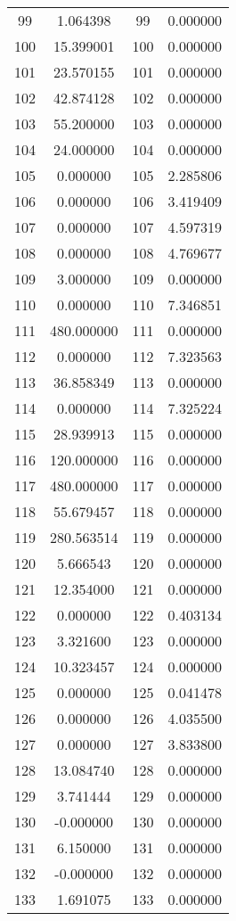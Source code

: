 \documentclass[12pt]{article}
\begin{document}
\begin{longtable}{@{}cccc@{}}
99 & 1.064398 & 99 & 0.000000 \\
100 & 15.399001 & 100 & 0.000000 \\
101 & 23.570155 & 101 & 0.000000 \\
102 & 42.874128 & 102 & 0.000000 \\
103 & 55.200000 & 103 & 0.000000 \\
104 & 24.000000 & 104 & 0.000000 \\
105 & 0.000000 & 105 & 2.285806 \\
106 & 0.000000 & 106 & 3.419409 \\
107 & 0.000000 & 107 & 4.597319 \\
108 & 0.000000 & 108 & 4.769677 \\
109 & 3.000000 & 109 & 0.000000 \\
110 & 0.000000 & 110 & 7.346851 \\
111 & 480.000000 & 111 & 0.000000 \\
112 & 0.000000 & 112 & 7.323563 \\
113 & 36.858349 & 113 & 0.000000 \\
114 & 0.000000 & 114 & 7.325224 \\
115 & 28.939913 & 115 & 0.000000 \\
116 & 120.000000 & 116 & 0.000000 \\
117 & 480.000000 & 117 & 0.000000 \\
118 & 55.679457 & 118 & 0.000000 \\
119 & 280.563514 & 119 & 0.000000 \\
120 & 5.666543 & 120 & 0.000000 \\
121 & 12.354000 & 121 & 0.000000 \\
122 & 0.000000 & 122 & 0.403134 \\
123 & 3.321600 & 123 & 0.000000 \\
124 & 10.323457 & 124 & 0.000000 \\
125 & 0.000000 & 125 & 0.041478 \\
126 & 0.000000 & 126 & 4.035500 \\
127 & 0.000000 & 127 & 3.833800 \\
128 & 13.084740 & 128 & 0.000000 \\
129 & 3.741444 & 129 & 0.000000 \\
130 & -0.000000 & 130 & 0.000000 \\
131 & 6.150000 & 131 & 0.000000 \\
132 & -0.000000 & 132 & 0.000000 \\
133 & 1.691075 & 133 & 0.000000 \\

\end{longtable}
\end{document}
